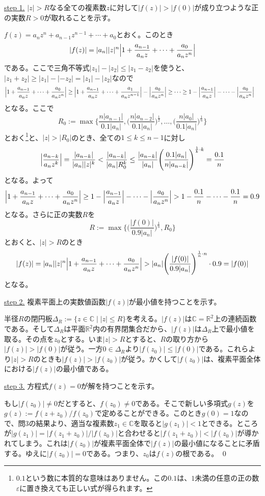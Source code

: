 \noindent \underline{step 1.} $|z|>R$なる全ての複素数$z$に対して$|f(z)|>|f(0)|$が成り立つような正の実数$R>0$が取れることを示す。

$f(z)=a_n z^n + a_{n-1} z^{n-1} + \cdots + a_0$とおく。このとき
\[
|f(z)| = |a_n||z|^n\Bigl|1+\frac{a_{n-1}}{a_n z} + \cdots + \frac{a_0}{a_n z^n}\Bigr|
\]
である。ここで三角不等式$|z_1|-|z_2|\leq|z_1-z_2|$を使うと、$|z_1+z_2|\geq|z_1|-|-z_2|=|z_1|-|z_2|$なので
\begin{align*}
\Bigl|1+\frac{a_{n-1}}{a_n z} + \cdots + \frac{a_0}{a_n z^n}\Bigr|
&\geq \Bigl|1+\frac{a_{n-1}}{a_n z} + \cdots + \frac{a_1}{a_n z^{n-1}}\Bigr| - \Bigl|\frac{a_0}{a_n z^n}\Bigr| \geq \cdots
\geq 1-\Bigl|\frac{a_{n-1}}{a_n z}\Bigr| - \cdots -\Bigl|\frac{a_{0}}{a_n z^n}\Bigr|
\end{align*}
となる。ここで
\[
R_0:=\max\Biggl\{\frac{n|a_{n-1}|}{0.1|a_n|},\Biggl(\frac{n|a_{n-2}|}{0.1|a_n|}\Biggr)^{\frac{1}{2}},\ldots,\Biggl(\frac{n|a_{0}|}{0.1|a_n|}\Biggr)^{\frac{1}{n}}\Biggr\}
\]
とおく\footnote{$0.1$という数に本質的な意味はありません。この$0.1$は、$1$未満の任意の正の数$\varepsilon$に置き換えても正しい式が得られます。}と、$|z|>|R_0|$のとき、全ての$1\leq k\leq n-1$に対し
\[
\Bigl|\frac{a_{n-k}}{a_n z^k}\Bigr| = \frac{|a_{n-k}|}{|a_n||z|^k} < \frac{|a_{n-k}|}{|a_n|R_0^k} \leq \frac{|a_{n-k}|}{|a_n|}\Biggl(\frac{0.1|a_n|}{n|a_{n-k}|}\Biggr)^{\frac{1}{k}\cdot k} = \frac{0.1}{n}
\]
となる。よって
\[
\Bigl|1+\frac{a_{n-1}}{a_n z} + \cdots + \frac{a_0}{a_n z^n}\Bigr| \geq
1-\Bigl|\frac{a_{n-1}}{a_n z}\Bigr| - \cdots -\Bigl|\frac{a_{0}}{a_n z^n}\Bigr|
> 1-\frac{0.1}{n}-\cdots-\frac{0.1}{n} = 0.9
\]
となる。さらに正の実数$R$を
\[
R:=\max\Biggl\{\Biggl(\frac{|f(0)|}{0.9|a_n|}\Biggr)^{\frac{1}{n}},R_0\Biggr\}
\]
とおくと、$|z|>R$のとき
\[
|f(z)| = |a_n||z|^n\Bigl|1+\frac{a_{n-1}}{a_n z} + \cdots + \frac{a_0}{a_n z^n}\Bigr| > |a_n|\Biggl(\frac{|f(0)|}{0.9|a_n|}\Biggr)^{\frac{1}{n}\cdot n} \cdot 0.9 = |f(0)|
\]
となる。

\noindent \underline{step 2.} 複素平面上の実数値函数$|f(z)|$が最小値を持つことを示す。

半径$R$の閉円板$\Delta_R:=\{z\in\mathbb{C}\mid |z|\leq R\}$を考える。$|f(z)|$は$\mathbb{C}=\mathbb{R}^2$上の連続函数である。そして$\Delta_R$は平面$\mathbb{R}^2$内の有界閉集合だから、$|f(z)|$は$\Delta_R$上で最小値を取る。その点を$z_0$とする。いま$|z|>R$とすると、$R$の取り方から$|f(z)|>|f(0)|$が従う。一方$0\in\Delta_R$より$|f(z_0)|\leq |f(0)|$である。これらより$|z|>R$のときも$|f(z)|>|f(z_0)|$が従う。かくして$|f(z_0)|$は、複素平面全体における$|f(z)|$の最小値である。

\noindent \underline{step 3.} 方程式$f(z)=0$が解を持つことを示す。

もし$|f(z_0)|\neq 0$だとすると、$f(z_0)\neq 0$である。そこで新しい多項式$g(z)$を$g(z):=f(z+z_0)/f(z_0)$で定めることができる。このとき$g(0)=1$なので、問3の結果より、適当な複素数$z_1\in\mathbb{C}$を取ると$|g(z_1)|<1$とできる。ところが$|g(z_1)| = |f(z_1+z_0)| / |f(z_0)|$と合わせると$|f(z_1+z_0)| < |f(z_0)|$が導かれてしまう。これは$|f(z_0)|$が複素平面全体で$|f(z)|$の最小値になることに矛盾する。ゆえに$|f(z_0)|=0$である。つまり、$z_0$は$f(z)$の根である。 \qed

